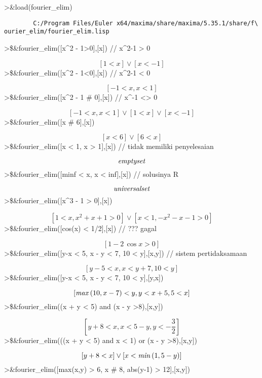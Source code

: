 \documentclass[
]{book}
\begin{document}
\textgreater\&load(fourier\_elim)

\begin{verbatim}
        C:/Program Files/Euler x64/maxima/share/maxima/5.35.1/share/f\
ourier_elim/fourier_elim.lisp
\end{verbatim}

\textgreater\$\&fourier\_elim({[}x\^{}2 - 1\textgreater0{]},{[}x{]}) // x\^{}2-1 \textgreater{} 0

\[\left[ 1<x \right] \lor \left[ x<-1 \right]\]\textgreater\$\&fourier\_elim({[}x\^{}2 - 1\textless0{]},{[}x{]}) // x\^{}2-1 \textless{} 0

\[\left[ -1<x , x<1 \right]\]\textgreater\$\&fourier\_elim({[}x\^{}2 - 1 \# 0{]},{[}x{]}) // x\^{}-1 \textless\textgreater{} 0

\[\left[ -1<x , x<1 \right] \lor \left[ 1<x \right] \lor \left[ x<-1\right]\]\textgreater\$\&fourier\_elim({[}x \# 6{]},{[}x{]})

\[\left[ x<6 \right] \lor \left[ 6<x \right]\]\textgreater\$\&fourier\_elim({[}x \textless{} 1, x \textgreater{} 1{]},{[}x{]}) // tidak memiliki penyelesaian

\[{\it emptyset}\]\textgreater\$\&fourier\_elim({[}minf \textless{} x, x \textless{} inf{]},{[}x{]}) // solusinya R

\[{\it universalset}\]\textgreater\$\&fourier\_elim({[}x\^{}3 - 1 \textgreater{} 0{]},{[}x{]})

\[\left[ 1<x , x^2+x+1>0 \right] \lor \left[ x<1 , -x^2-x-1>0\right]\]\textgreater\$\&fourier\_elim({[}cos(x) \textless{} 1/2{]},{[}x{]}) // ??? gagal

\[\left[ 1-2\,\cos x>0 \right]\]\textgreater\$\&fourier\_elim({[}y-x \textless{} 5, x - y \textless{} 7, 10 \textless{} y{]},{[}x,y{]}) // sistem pertidaksamaan

\[\left[ y-5<x , x<y+7 , 10<y \right]\]\textgreater\$\&fourier\_elim({[}y-x \textless{} 5, x - y \textless{} 7, 10 \textless{} y{]},{[}y,x{]})

\[\left[ {\it max}\left(10 , x-7\right)<y , y<x+5 , 5<x \right]\]\textgreater\$\&fourier\_elim((x + y \textless{} 5) and (x - y \textgreater8),{[}x,y{]})

\[\left[ y+8<x , x<5-y , y<-\frac{3}{2} \right]\]\textgreater\$\&fourier\_elim(((x + y \textless{} 5) and x \textless{} 1) or (x - y \textgreater8),{[}x,y{]})

\[\left[ y+8<x \right] \lor \left[ x<{\it min}\left(1 , 5-y\right)\right]\]\textgreater\&fourier\_elim({[}max(x,y) \textgreater{} 6, x \# 8, abs(y-1) \textgreater{} 12{]},{[}x,y{]})
\end{document}
